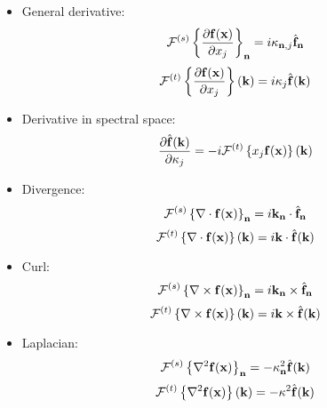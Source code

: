 \documentclass[11pt]{article}
\begin{document}
\begin{itemize}

\item General derivative:
\begin{equation*} 
  \mathcal{F}^{(s)} \left \{ \dfrac{\partial \mathbf{f} (\mathbf{x})}{\partial x_j} \right \}_{\mathbf{n}}  = i \kappa_{\mathbf{n},j} \hat{\mathbf{f}}_{\mathbf{n}}
\end{equation*} 
\begin{equation*} 
  \mathcal{F}^{(t)}\left \{ \dfrac{\partial \mathbf{f} (\mathbf{x})}{\partial x_j} \right \}(\mathbf{k}) = i \kappa_j \hat{\mathbf{f}}(\mathbf{k})
\end{equation*}

\item Derivative in spectral space:
\begin{equation*}
  \frac{\partial \hat{\mathbf{f}}(\mathbf{k})}{\partial \kappa_j} = -i \mathcal{F}^{(t)} \left \{ x_j \mathbf{f}(\mathbf{x}) \right \} (\mathbf{k})
\end{equation*}

\item Divergence:
\begin{equation*}
  \mathcal{F}^{(s)} \left \{ \nabla \cdot \mathbf{f}(\mathbf{x}) \right \}_{\mathbf{n}} = i \mathbf{k}_{\mathbf{n}} \cdot \hat{\mathbf{f}}_{\mathbf{n}}
\end{equation*}
\begin{equation*}
  \mathcal{F}^{(t)} \left \{ \nabla \cdot \mathbf{f}(\mathbf{x}) \right \} (\mathbf{k}) = i \mathbf{k} \cdot \hat{\mathbf{f}}(\mathbf{k})
\end{equation*}

\item Curl:
\begin{equation*}
  \mathcal{F}^{(s)} \left \{ \nabla \times \mathbf{f}(\mathbf{x}) \right \}_{\mathbf{n}} = i \mathbf{k}_{\mathbf{n}} \times \hat{\mathbf{f}}_{\mathbf{n}}
\end{equation*}
\begin{equation*}
  \mathcal{F}^{(t)} \left \{ \nabla \times \mathbf{f}(\mathbf{x}) \right \} (\mathbf{k}) = i \mathbf{k} \times \hat{\mathbf{f}}(\mathbf{k})
\end{equation*}

\item Laplacian:
\begin{equation*}
  \mathcal{F}^{(s)} \left \{ \nabla^2 \mathbf{f}(\mathbf{x}) \right \}_{\mathbf{n}} = - \kappa_{\mathbf{n}}^2 \hat{\mathbf{f}}(\mathbf{k})
\end{equation*}
\begin{equation*}
  \mathcal{F}^{(t)} \left \{ \nabla^2 \mathbf{f}(\mathbf{x}) \right \} (\mathbf{k}) = - \kappa^2 \hat{\mathbf{f}}(\mathbf{k})
\end{equation*}

\end{itemize}
\end{document}
